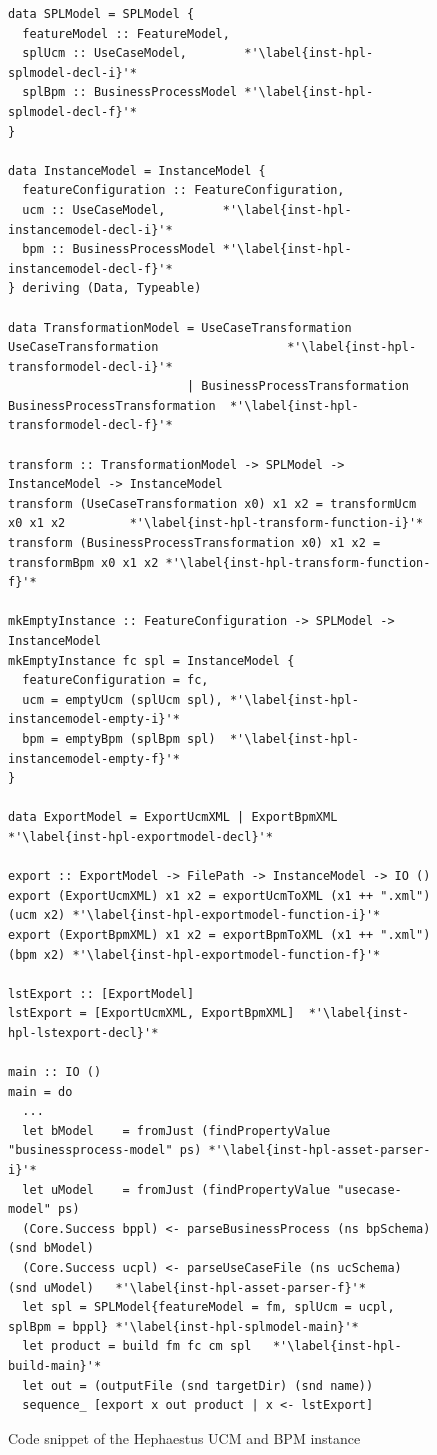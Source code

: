 \begin{figure}
\begin{lstlisting}
data SPLModel = SPLModel {
  featureModel :: FeatureModel,
  splUcm :: UseCaseModel,        *'\label{inst-hpl-splmodel-decl-i}'*
  splBpm :: BusinessProcessModel *'\label{inst-hpl-splmodel-decl-f}'* 
}

data InstanceModel = InstanceModel {
  featureConfiguration :: FeatureConfiguration,
  ucm :: UseCaseModel,        *'\label{inst-hpl-instancemodel-decl-i}'*
  bpm :: BusinessProcessModel *'\label{inst-hpl-instancemodel-decl-f}'* 
} deriving (Data, Typeable)

data TransformationModel = UseCaseTransformation UseCaseTransformation                  *'\label{inst-hpl-transformodel-decl-i}'*
                         | BusinessProcessTransformation BusinessProcessTransformation  *'\label{inst-hpl-transformodel-decl-f}'*

transform :: TransformationModel -> SPLModel -> InstanceModel -> InstanceModel
transform (UseCaseTransformation x0) x1 x2 = transformUcm x0 x1 x2         *'\label{inst-hpl-transform-function-i}'*
transform (BusinessProcessTransformation x0) x1 x2 = transformBpm x0 x1 x2 *'\label{inst-hpl-transform-function-f}'*

mkEmptyInstance :: FeatureConfiguration -> SPLModel -> InstanceModel
mkEmptyInstance fc spl = InstanceModel {
  featureConfiguration = fc,
  ucm = emptyUcm (splUcm spl), *'\label{inst-hpl-instancemodel-empty-i}'*
  bpm = emptyBpm (splBpm spl)  *'\label{inst-hpl-instancemodel-empty-f}'*
}

data ExportModel = ExportUcmXML | ExportBpmXML *'\label{inst-hpl-exportmodel-decl}'*

export :: ExportModel -> FilePath -> InstanceModel -> IO ()
export (ExportUcmXML) x1 x2 = exportUcmToXML (x1 ++ ".xml") (ucm x2) *'\label{inst-hpl-exportmodel-function-i}'*
export (ExportBpmXML) x1 x2 = exportBpmToXML (x1 ++ ".xml") (bpm x2) *'\label{inst-hpl-exportmodel-function-f}'*

lstExport :: [ExportModel]
lstExport = [ExportUcmXML, ExportBpmXML]  *'\label{inst-hpl-lstexport-decl}'*

main :: IO ()
main = do
  ...
  let bModel    = fromJust (findPropertyValue "businessprocess-model" ps) *'\label{inst-hpl-asset-parser-i}'*
  let uModel    = fromJust (findPropertyValue "usecase-model" ps)
  (Core.Success bppl) <- parseBusinessProcess (ns bpSchema) (snd bModel)
  (Core.Success ucpl) <- parseUseCaseFile (ns ucSchema) (snd uModel)   *'\label{inst-hpl-asset-parser-f}'*
  let spl = SPLModel{featureModel = fm, splUcm = ucpl, splBpm = bppl} *'\label{inst-hpl-splmodel-main}'*
  let product = build fm fc cm spl   *'\label{inst-hpl-build-main}'*
  let out = (outputFile (snd targetDir) (snd name))
  sequence_ [export x out product | x <- lstExport]
\end{lstlisting}
\caption{Code snippet of the Hephaestus UCM and BPM instance}
\label{fig:code-hp-ucm-bpm}
\end{figure}





